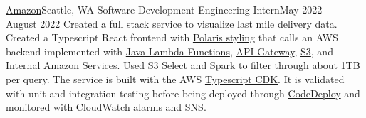 \resumeSubheading
{\href{https://www.amazon.jobs/en/teams/last-mile}{Amazon}}{Seattle, WA}
{Software Development Engineering Intern}{May 2022 -- August 2022}
\resumeItemListStart
{}
{Created a full stack service to visualize last mile delivery data. Created a Typescript React frontend with \href{https://github.com/Shopify/polaris}{Polaris styling} that calls an AWS backend implemented with \href{https://docs.aws.amazon.com/lambda/latest/dg/lambda-java.html}{Java Lambda Functions}, \href{https://aws.amazon.com/api-gateway/}{API Gateway}, \href{https://aws.amazon.com/s3/}{S3}, and Internal Amazon Services. Used \href{https://docs.aws.amazon.com/AmazonS3/latest/userguide/selecting-content-from-objects.html}{S3 Select} and \href{https://spark.apache.org/}{Spark} to filter through about 1TB per query.}
{The service is built with the AWS \href{https://docs.aws.amazon.com/cdk/v2/guide/work-with-cdk-typescript.html}{Typescript CDK}. It is validated with unit and integration testing before being deployed through \href{https://docs.aws.amazon.com/codedeploy/latest/userguide/welcome.html}{CodeDeploy} and monitored with \href{https://docs.aws.amazon.com/AmazonCloudWatch/latest/monitoring/WhatIsCloudWatch.html}{CloudWatch} alarms and \href{https://aws.amazon.com/sns/}{SNS}.}
\resumeItemListEnd
